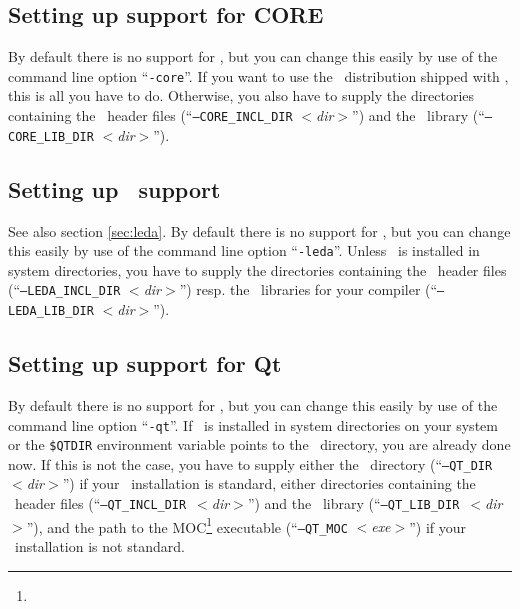 \subsection{Setting up support for CORE}\label{sec:core-setup}

By default there is no support for \core, but you can change this
easily by use of the command line option ``\texttt{-core}''. If you
want to use the \core\ distribution shipped with \cgal, this is all
you have to do. Otherwise, you also have to supply the directories
containing the \core\ header files (``\texttt{--CORE\_INCL\_DIR}
\textit{$<$dir$>$}'') and the \core\ library
(``\texttt{--CORE\_LIB\_DIR}
\textit{$<$dir$>$}'').

\subsection{Setting up \leda\ support}\label{sec:leda-setup}

See also section \ref{sec:leda}. By default there is no support for
\leda, but you can change this easily by use of the command line
option ``\texttt{-leda}''.  Unless \leda\ is installed in system
directories, you have to supply the directories containing
the \leda\ header files (``\texttt{--LEDA\_INCL\_DIR}
\textit{$<$dir$>$}'') resp. the \leda\ 
libraries for your compiler (``\texttt{--LEDA\_LIB\_DIR} {\it
  $<$dir$>$}'').

\subsection{Setting up support for Qt}\label{sec:qt-setup}

By default there is no support for \qt, but you can change this easily
by use of the command line option ``\texttt{-qt}''. If \qt\ is
installed in system directories on your system or the \texttt{\$QTDIR}
environment variable points to the \qt\ directory, you are already
done now. If this is not the case, you have to supply either the \qt\ 
directory (``\texttt{--QT\_DIR}~\textit{$<$dir$>$}'')
if your \qt\ installation is standard, either directories containing
the \qt\ header files
(``\texttt{--QT\_INCL\_DIR}~\textit{$<$dir$>$}'')
and the \qt\ library
(``\texttt{--QT\_LIB\_DIR}~\textit{$<$dir$>$}'')\TTindex{QT\_LIB\_DIR},
and the path to the MOC\footnote{\qtmocpage} executable
(``\texttt{--QT\_MOC} \textit{$<$exe$>$}'')\TTindex{QT\_MOC} if your
\qt\ installation is not standard.

